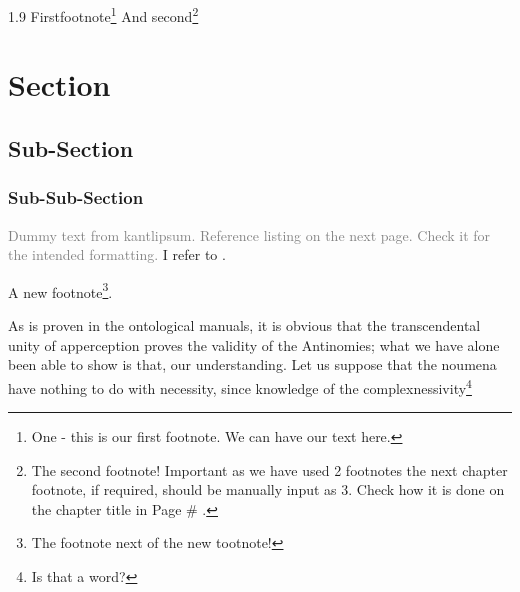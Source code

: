 \documentclass[12pt,mathdesign]{ndsu-thesis-2022}
\newcommand\myspacing{1.9}%
\begin{document}
\begin{spacing}{\myspacing}
\kant[9]
Firstfootnote\footnote{One - this is our first footnote. We can have our text here.} And second\footnote{The second footnote! Important as we have used 2 footnotes the next chapter footnote, if required, should be manually input as 3. Check how it is done on the chapter title in Page \# \pageref{my2chap}.}



\kant[9]

\kant[2-4]


\checkEndRefsection%

\label{my2chap}

\checkBeginRefsection%

\kant[20-21]

\section{Section}
\subsection{Sub-Section}
\subsubsection{Sub-Sub-Section}

\textcolor{gray}{Dummy text from kantlipsum. Reference listing on the next page. Check it for the intended formatting.} I refer to \citep{butin2009education, rudestam2014surviving, Goossens2008g,cassuto2010advising,pires2021teens}. \kant[9]

A new footnote\footnote{The footnote next of the new tootnote!}.

As is proven in the ontological manuals, it is obvious that the transcendental unity of apperception proves the validity of the Antinomies; what we have alone been able to show is that, our understanding. Let us suppose that the noumena have nothing to do with necessity, since knowledge of the complexnessivity\footnote{Is that a word?}


\end{spacing}
\end{document}
